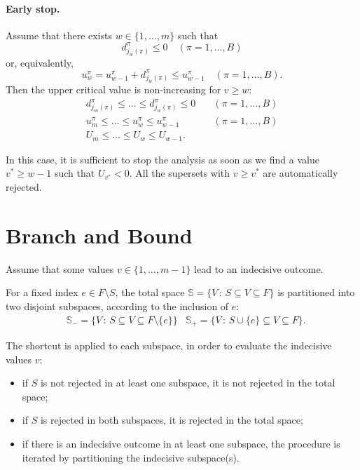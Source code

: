 \documentclass[11pt,a4paper,openright,twoside]{article}
\begin{document}
\paragraph{Early stop.} Assume that there exists $w\in\{1,\ldots,m\}$ such that
\[d_{j_w(\pi)}^\pi\leq 0\quad (\pi=1,\ldots,B)\]
or, equivalently,
\[u_w^\pi =u_{w-1}^\pi +d_{j_w(\pi)}^\pi\leq u_{w-1}^\pi\quad (\pi=1,\ldots,B).\]
Then the upper critical value is non-increasing for $v\geq w$:
\begin{align*}
d_{j_m(\pi)}^\pi\leq \ldots \leq d_{j_w(\pi)}^\pi \leq 0&\quad(\pi=1,\ldots,B)\\
u_m^\pi \leq\ldots\leq u_w^\pi\leq u_{w-1}^\pi&\quad(\pi=1,\ldots,B)\\
U_m \leq\ldots\leq U_w\leq U_{w-1}. &
\end{align*}

In this case, it is sufficient to stop the analysis as soon as we find a value $v^*\geq w-1$ such that $U_{v^*}<0$. All the supersets with $v\geq v^*$ are automatically rejected.





\vspace{10mm}

\section{Branch and Bound}
Assume that some values $v\in\{1,\ldots,m-1\}$ lead to an indecisive outcome. 

For a fixed index $e\in F\setminus S$, the total space $\mathbb{S}=\{V\,:\,S\subseteq V\subseteq F\}$ is partitioned into two disjoint subspaces, according to the inclusion of $e$:
\begin{align*}
&\mathbb{S}_{-}=\{V\,:\,S\subseteq V\subseteq F\setminus\{e\}\} & \mathbb{S}_{+}=\{V\,:\,S\cup\{e\}\subseteq V\subseteq F\}.
\end{align*}

The shortcut is applied to each subspace, in order to evaluate the indecisive values $v$:
\begin{itemize}
\item if $S$ is not rejected in at least one subspace, it is not rejected in the total space;
\item if $S$ is rejected in both subspaces, it is rejected in the total space;
\item if there is an indecisive outcome in at least one subspace, the procedure is iterated by partitioning the indecisive subspace(s).
\end{itemize}
\end{document}
